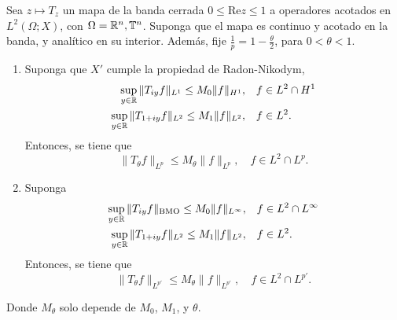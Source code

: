 \begin{corollary}
	Sea $z\mapsto T_z$ un mapa de la banda cerrada $0\leq\mathrm{Re} z\leq1$ a operadores acotados en $L^2(\Omega;X)$, con $\Omega=\mathbb{R}^n,\mathbb{T}^n$. Suponga que el mapa es continuo y acotado en la banda, y analítico en su interior. Además, fije $\frac{1}{p} = 1- \frac{\theta}{2}$, para $0<\theta<1$.
	\begin{enumerate}
		\item Suponga que $X'$ cumple la propiedad de Radon-Nikodym,
		\begin{align*}
			\sup_{y\in\mathbb{R}} \|T_{iy}f\|_{L^1} \leq M_0\|f\|_{H^1}, &\quad f\in L^2\cap H^1\\
			\sup_{y\in\mathbb{R}} \|T_{1+iy}f\|_{L^2} \leq M_1\|f\|_{L^2}, &\quad f\in L^2.
		\end{align*}
		Entonces,  se tiene que 
		\begin{equation*}
			\|T_\theta f\|_{L^p} \leq M_\theta \|f\|_{L^p}, \quad f \in L^2\cap L^p.
		\end{equation*}
		\item Suponga 
		\begin{align*}
			\sup_{y\in\mathbb{R}} \|T_{iy}f\|_{\mathrm{BMO}} \leq M_0\|f\|_{L^\infty}, &\quad f\in L^2\cap L^\infty \\
			\sup_{y\in\mathbb{R}} \|T_{1+iy}f\|_{L^2} \leq M_1\|f\|_{L^2}, &\quad f\in L^2.
		\end{align*}
		Entonces, se tiene que 
		\begin{equation*}
			\|T_\theta f\|_{L^{p'}} \leq M_\theta \|f\|_{L^{p'}}, \quad f \in L^2\cap L^{p'}.
		\end{equation*}
	\end{enumerate}
	Donde $M_\theta$ solo depende de $M_0$, $M_1$, y $\theta$.
\end{corollary}
